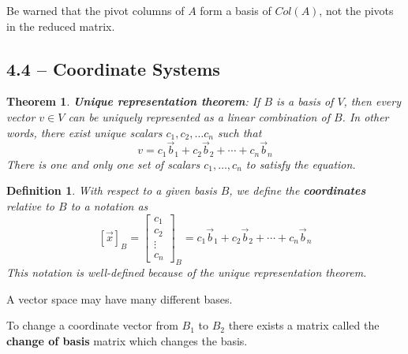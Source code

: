 \documentclass[11pt]{article}
\newtheorem{thm}{Theorem}
\newtheorem{defn}{Definition}
\begin{document}
Be warned that the pivot columns of $A$ form a basis of $Col(A)$, not the pivots in the reduced matrix.

\subsection{4.4 -- Coordinate Systems}

\begin{thm}
  \textbf{Unique representation theorem}: If $B$ is a basis of $V$, then every vector $v \in V$ can be uniquely
  represented as a linear combination of $B$. In other words, there exist unique scalars $c_{1}, c_{2}, \ldots c_{n}$ such that
  \[v = c_{1}\vec{b}_{1}+c_{2}\vec{b}_{2}+\cdots+c_{n}\vec{b}_{n}\]
  There is one and only one set of scalars $c_{1}, \ldots, c_{n}$ to satisfy the equation.
\end{thm}


\begin{defn}
  With respect to a given basis $B$, we define the \textbf{coordinates} relative to $B$ to a notation as
  \[[\vec{x}]_{B}=\begin{bmatrix}c_{1}\\c_{2}\\\vdots\\c_{n}\end{bmatrix}_{B} = c_{1}\vec{b}_{1}+c_{2}\vec{b}_{2}+\cdots+c_{n}\vec{b}_{n}\]
  This notation is well-defined because of the unique representation theorem.
\end{defn}

A vector space may have many different bases.


To change a coordinate vector from $B_{1}$ to $B_{2}$ there exists a matrix called the \textbf{change of basis} matrix which changes the basis.
\end{document}
